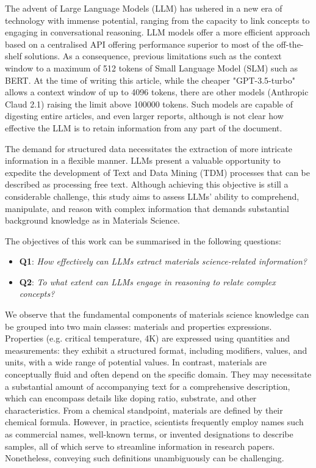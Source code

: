 \documentclass[a4paper]{article}
\begin{document}
The advent of Large Language Models (LLM) has ushered in a new era of technology with immense potential, ranging from the capacity to link concepts to engaging in conversational reasoning.
LLM models offer a more efficient approach based on a centralised API offering performance superior to most of the off-the-shelf solutions. 
As a consequence, previous limitations such as the context window to a maximum of 512 tokens of Small Language Model (SLM) such as BERT. 
At the time of writing this article, while the cheaper  "GPT-3.5-turbo" allows a context window of up to 4096 tokens, there are other models (Anthropic Claud 2.1) raising the limit above 100000 tokens.  
Such models are capable of digesting entire articles, and even larger reports, although is not clear how effective the LLM is to retain information from any part of the document.

The demand for structured data necessitates the extraction of more intricate information in a flexible manner. 
LLMs present a valuable opportunity to expedite the development of Text and Data Mining (TDM) processes that can be described as processing free text. 
Although achieving this objective is still a considerable challenge, this study aims to assess LLMs' ability to comprehend, manipulate, and reason with complex information that demands substantial background knowledge as in Materials Science. 

The objectives of this work can be summarised in the following questions: 
\begin{itemize}
    \item \textbf{Q1}: \textit{How effectively can LLMs extract materials science-related information?}
    \item \textbf{Q2}: \textit{To what extent can LLMs engage in reasoning to relate complex concepts?}
\end{itemize}

We observe that the fundamental components of materials science knowledge can be grouped into two main classes: materials and properties expressions. 
Properties (e.g. critical temperature, 4K) are expressed using quantities and measurements: they exhibit a structured format, including modifiers, values, and units, with a wide range of potential values. 
In contrast, materials are conceptually fluid and often depend on the specific domain. They may necessitate a substantial amount of accompanying text for a comprehensive description, which can encompass details like doping ratio, substrate, and other characteristics. 
From a chemical standpoint, materials are defined by their chemical formula. 
However, in practice, scientists frequently employ names such as commercial names, well-known terms, or invented designations to describe samples, all of which serve to streamline information in research papers. Nonetheless, conveying such definitions unambiguously can be challenging.
\end{document}
